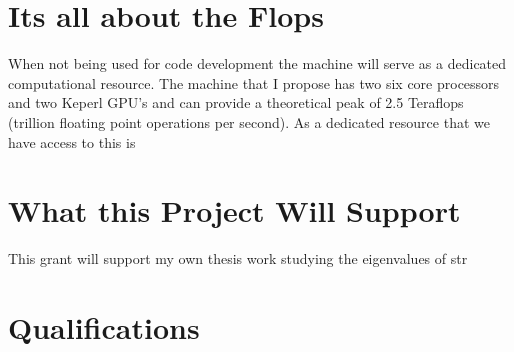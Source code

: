 \documentclass[11pt]{article}
\begin{document}
  \section*{Its all about the Flops} %
  When not being used for code development the machine will serve as a dedicated computational resource.  
  The machine that I propose has two six core processors and two Keperl GPU's and can provide a theoretical peak of 2.5 Teraflops (trillion floating point operations per second).  
  As a dedicated resource that we have access to this is

  \section*{What this Project Will Support} %
  This grant will support my own thesis work studying the eigenvalues of str

  \section*{Qualifications} %
\end{document}
